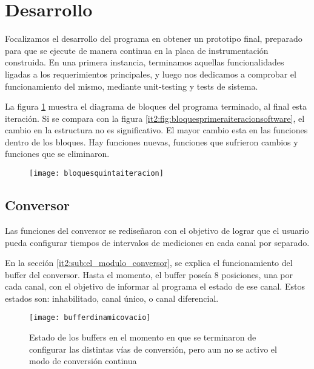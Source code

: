 
\section{Desarrollo} %
\label{it5:sec:desarrollo}

Focalizamos el desarrollo del programa en obtener un prototipo final, preparado para que se ejecute de manera continua en la placa de instrumentación construida. En una primera instancia, terminamos aquellas funcionalidades ligadas a los requerimientos principales, y luego nos dedicamos a comprobar el funcionamiento del mismo, mediante unit-testing y tests de sistema.

La figura \ref{it5:fig:bloquesquintaiteracion} muestra el diagrama de bloques del programa terminado, al final esta iteración. Si se compara con la figura \ref{it2:fig:bloquesprimeraiteracionsoftware}, el cambio en la estructura no es significativo. El mayor cambio esta en las funciones dentro de los bloques. Hay funciones nuevas, funciones que sufrieron cambios y funciones que se eliminaron.

\begin{figure}[h]
  \centering
  \texttt{[image: bloquesquintaiteracion]}
  \caption{}\label{it5:fig:bloquesquintaiteracion}
\end{figure}

\subsection{Conversor} %
\label{sub:conversor}

Las funciones del conversor se rediseñaron con el objetivo de lograr que el usuario pueda configurar tiempos de intervalos de mediciones en cada canal por separado.

En la sección \ref{it2:sub:el_modulo_conversor}, se explica el funcionamiento del buffer del conversor. Hasta el momento, el buffer poseía 8 posiciones, una por cada canal, con el objetivo de informar al programa el estado de ese canal. Estos estados son: inhabilitado, canal único, o canal diferencial.

\begin{figure}[h]
  \centering
  \texttt{[image: bufferdinamicovacio]}
  \caption{Estado de los buffers en el momento en que se terminaron de configurar las distintas vías de conversión, pero aun no se activo el modo de conversión continua}\label{it5:fig:bufferdinamicovacio}
\end{figure}

